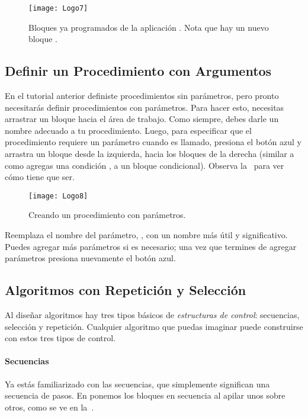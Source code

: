 \begin{figure}[H]
  \centering
  \texttt{[image: Logo7]}
  \caption{Bloques ya programados de la aplicación
    . Nota que hay un nuevo bloque .}
  \label{fig:Logo7}
\end{figure}

\subsection*{Definir un Procedimiento con Argumentos}

En el tutorial anterior definiste procedimientos sin
parámetros, pero pronto necesitarás definir procedimientos con
parámetros. Para hacer esto, necesitas arrastrar un bloque
 hacia el área de trabajo. Como siempre, debes
darle un nombre adecuado a tu procedimiento. Luego, para especificar
que el procedimiento requiere un parámetro cuando es llamado, presiona
el botón azul y arrastra un bloque  desde la
izquierda, hacia los bloques de la derecha (similar a como agregas una
condición , a un bloque condicional). Observa
la~ para ver cómo tiene que ser.

\begin{figure}[H]
  \centering
  \texttt{[image: Logo8]}
  \caption{Creando un procedimiento con parámetros.}
  \label{fig:Logo8}
\end{figure}

Reemplaza el nombre del parámetro, , con un nombre más
útil y significativo. Puedes agregar más parámetros si es necesario;
una vez que termines de agregar parámetros presiona nuevamente el
botón azul.

\subsection*{Algoritmos con Repetición y Selección}

Al diseñar algoritmos hay tres tipos básicos de \emph{estructuras de
  control}: secuencias, selección y repetición. Cualquier algoritmo
que puedas imaginar puede construirse con estos tres tipos de control.

\paragraph{Secuencias} Ya estás familiarizado con las secuencias, que
simplemente significan una secuencia de pasos. En \AppInventor ponemos
los bloques en secuencia al apilar unos sobre otros, como se ve en
la~.

